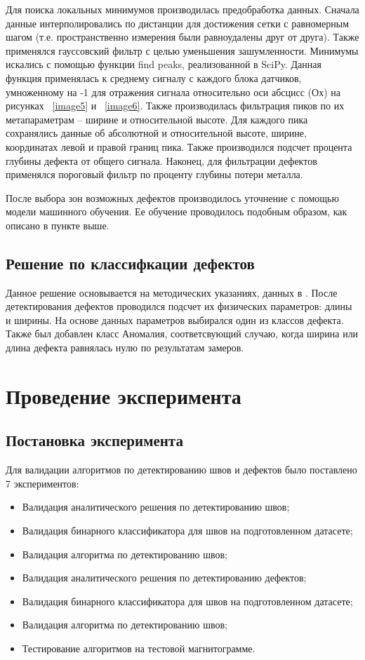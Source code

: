 \documentclass[a4paper,article,14pt]{extarticle}
\begin{document}
Для поиска локальных минимумов производилась предобработка данных. Сначала данные интерполировались по 
дистанции для достижения сетки с равномерным шагом (т.е. пространственно измерения были равноудалены друг от друга). 
Также применялся гауссовский фильтр с целью уменьшения зашумленности. Минимумы искались с помощью функции find peaks, 
реализованной в SciPy. Данная функция применялась к среднему сигналу с каждого блока датчиков, умноженному на -1 
для отражения сигнала относительно оси абсцисс (Ох) на рисунках  ~\ref{image5} и ~\ref{image6}. Также производилась фильтрация пиков по их 
метапараметрам – ширине и относительной высоте. Для каждого пика сохранялись данные об абсолютной и относительной 
высоте, ширине, координатах левой и правой границ пика. Также производился подсчет процента глубины дефекта от общего 
сигнала. Наконец, для фильтрации дефектов применялся пороговый фильтр по проценту глубины потери металла.

После выбора зон возможных дефектов производилось уточнение с помощью модели машинного обучения. Ее обучение 
проводилось подобным образом, как описано в пункте выше.

\subsection{Решение по классифкации дефектов}

Данное решение основывается на методических указаниях, данных в \cite{g1}. 
После детектирования дефектов проводился подсчет их физических параметров: длины и ширины. 
На основе данных параметров выбирался один из классов дефекта. 
Также был добавлен класс \flqq Аномалия\frqq, соответсвующий случаю, когда ширина или длина 
дефекта равнялась нулю по результатам замеров.


\pagebreak
\section{Проведение эксперимента}

\subsection{Постановка эксперимента}

Для валидации алгоритмов по детектированию швов и дефектов было поставлено 7 экспериментов:
\begin{itemize}
    \item Валидация аналитического решения по детектированию швов;
    \item Валидация бинарного классификатора для швов на подготовленном датасете;
    \item Валидация алгоритма по детектированию швов;
    \item Валидация аналитического решения по детектированию дефектов;
    \item Валидация бинарного классификатора для швов на подготовленном датасете;
    \item Валидация алгоритма по детектированию швов;
    \item Тестирование алгоритмов на тестовой магнитограмме.
\end{itemize}
\end{document}
